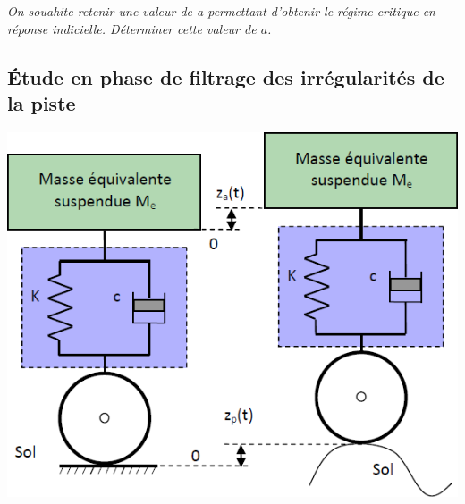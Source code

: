 \documentclass[10pt,fleqn]{article} %
\begin{document}
\begin{multicols}{2}
%
%
%
%
%
%




\subparagraph{}
\textit{On souahite retenir une valeur de a permettant d’obtenir le régime critique en réponse indicielle. Déterminer cette valeur de $a$.}
\ifprof
\begin{corrige}
\end{corrige}
\else
\fi


\subsection*{Étude en phase de filtrage des irrégularités de la piste}

\begin{center}
\includegraphics[width=\linewidth]{images/img_05}
\end{center}


\end{multicols}
\end{document}
